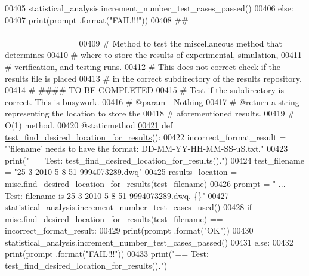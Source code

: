 \begin{DoxyCode}
00405             statistical\_analysis.increment\_number\_test\_cases\_passed()
00406         \textcolor{keywordflow}{else}:
00407             print(prompt .format(\textcolor{stringliteral}{"FAIL!!!"}))
00408     \textcolor{comment}{## =========================================================}
00409     \textcolor{comment}{#   Method to test the miscellaneous method that determines}
00410     \textcolor{comment}{#       where to store the results of experimental, simulation,}
00411     \textcolor{comment}{#       verification, and testing runs.}
00412     \textcolor{comment}{#   This does not correct check if the results file is placed}
00413     \textcolor{comment}{#       in the correct subdirectory of the results repository.}
00414     \textcolor{comment}{#   #### TO BE COMPLETED}
00415     \textcolor{comment}{#       Test if the subdirectory is correct. This is busywork.}
00416     \textcolor{comment}{#   @param - Nothing}
00417     \textcolor{comment}{#   @return a string representing the location to store the}
00418     \textcolor{comment}{#       aforementioned results.}
00419     \textcolor{comment}{#   O(1) method.}
00420     @staticmethod
\hypertarget{miscellaneous__tester_8py_source_l00421}{}\hyperlink{classutilities_1_1miscellaneous__tester_1_1misc__tester_afc179d9fd7be9c37989dd86340bb40f7}{00421}     \textcolor{keyword}{def }\hyperlink{classutilities_1_1miscellaneous__tester_1_1misc__tester_afc179d9fd7be9c37989dd86340bb40f7}{test\_find\_desired\_location\_for\_results}():
00422         incorrect\_format\_result = \textcolor{stringliteral}{"'filename' needs to have the format: DD-MM-YY-HH-MM-SS-uS.txt."}
00423         print(\textcolor{stringliteral}{"==   Test: test\_find\_desired\_location\_for\_results()."})
00424         test\_filename = \textcolor{stringliteral}{"25-3-2010-5-8-51-9994073289.dwq"}
00425         results\_location = misc.find\_desired\_location\_for\_results(test\_filename)
00426         prompt = \textcolor{stringliteral}{"  ... Test: filename is 25-3-2010-5-8-51-9994073289.dwq.  \{\}"}
00427         statistical\_analysis.increment\_number\_test\_cases\_used()
00428         \textcolor{keywordflow}{if} misc.find\_desired\_location\_for\_results(test\_filename) == incorrect\_format\_result:
00429             print(prompt .format(\textcolor{stringliteral}{"OK"}))
00430             statistical\_analysis.increment\_number\_test\_cases\_passed()
00431         \textcolor{keywordflow}{else}:
00432             print(prompt .format(\textcolor{stringliteral}{"FAIL!!!"}))
00433         print(\textcolor{stringliteral}{"==   Test: test\_find\_desired\_location\_for\_results()."})

\end{DoxyCode}

